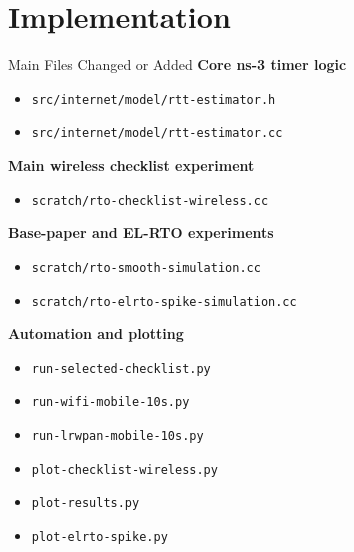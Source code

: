 \documentclass[aspectratio=169]{beamer}
\begin{document}
\section{Implementation}
\begin{frame}{Main Files Changed or Added}
  \textbf{Core ns-3 timer logic}
  \begin{itemize}
    \item \texttt{src/internet/model/rtt-estimator.h}
    \item \texttt{src/internet/model/rtt-estimator.cc}
  \end{itemize}

  \textbf{Main wireless checklist experiment}
  \begin{itemize}
    \item \texttt{scratch/rto-checklist-wireless.cc}
  \end{itemize}

  \textbf{Base-paper and EL-RTO experiments}
  \begin{itemize}
    \item \texttt{scratch/rto-smooth-simulation.cc}
    \item \texttt{scratch/rto-elrto-spike-simulation.cc}
  \end{itemize}

  \textbf{Automation and plotting}
  \begin{itemize}
    \item \texttt{run-selected-checklist.py}
    \item \texttt{run-wifi-mobile-10s.py}
    \item \texttt{run-lrwpan-mobile-10s.py}
    \item \texttt{plot-checklist-wireless.py}
    \item \texttt{plot-results.py}
    \item \texttt{plot-elrto-spike.py}
  \end{itemize}
\end{frame}
\end{document}
